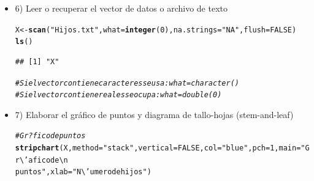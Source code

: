 \documentclass[12pt,letterpaper]{article}\usepackage[]{graphicx}\usepackage[]{color}
\makeatletter
\newcommand{\hlnum}[1]{\textcolor[rgb]{0.686,0.059,0.569}{#1}}%
\newcommand{\hlstr}[1]{\textcolor[rgb]{0.192,0.494,0.8}{#1}}%
\newcommand{\hlcom}[1]{\textcolor[rgb]{0.678,0.584,0.686}{\textit{#1}}}%
\newcommand{\hlstd}[1]{\textcolor[rgb]{0.345,0.345,0.345}{#1}}%
\newcommand{\hlkwb}[1]{\textcolor[rgb]{0.69,0.353,0.396}{#1}}%
\newcommand{\hlkwc}[1]{\textcolor[rgb]{0.333,0.667,0.333}{#1}}%
\newcommand{\hlkwd}[1]{\textcolor[rgb]{0.737,0.353,0.396}{\textbf{#1}}}%
\newenvironment{kframe}{%
 \def\at@end@of@kframe{}%
 \ifinner\ifhmode%
  \def\at@end@of@kframe{\end{minipage}}%
  \begin{minipage}{\columnwidth}%
 \fi\fi%
 \def\FrameCommand##1{\hskip\@totalleftmargin \hskip-\fboxsep
 \colorbox{shadecolor}{##1}\hskip-\fboxsep
     \hskip-\linewidth \hskip-\@totalleftmargin \hskip\columnwidth}%
 \MakeFramed {\advance\hsize-\width
   \@totalleftmargin\z@ \linewidth\hsize
   \@setminipage}}%
 {\par\unskip\endMakeFramed%
 \at@end@of@kframe}
\newenvironment{knitrout}{}{} %
\makeatother
\begin{document}
\begin {itemize}
\begin{knitrout}
\begin{kframe}
\begin{alltt}
\hlkwd{rm}\hlstd{(}\hlkwc{list}\hlstd{=}\hlkwd{ls}\hlstd{(}\hlkwc{all}\hlstd{=}\hlnum{TRUE}\hlstd{));}
\hlkwd{ls}\hlstd{()}
\end{alltt}
\begin{verbatim}
## character(0)
\end{verbatim}
\end{kframe}
\end{knitrout}
\newpage
\item 6) Leer o recuperar el vector de datos o archivo de texto
\begin{knitrout}
\color{fgcolor}\begin{kframe}
\begin{alltt}
\hlstd{X} \hlkwb{<-} \hlkwd{scan}\hlstd{(}\hlstr{"Hijos.txt"}\hlstd{,} \hlkwc{what} \hlstd{=} \hlkwd{integer}\hlstd{(}\hlnum{0}\hlstd{),} \hlkwc{na.strings} \hlstd{=} \hlstr{"NA"}\hlstd{,} \hlkwc{flush}\hlstd{=}\hlnum{FALSE}\hlstd{)}
\hlkwd{ls}\hlstd{()}
\end{alltt}
\begin{verbatim}
## [1] "X"
\end{verbatim}
\begin{alltt}
\hlcom{# Si el vector contiene caracteres se usa: what = character()}
\hlcom{# Si el vector contiene reales se ocupa: what = double(0)}
\end{alltt}
\end{kframe}
\end{knitrout}
\item 7) Elaborar el gr\'afico de puntos y diagrama de tallo-hojas (stem-and-leaf)
\begin{knitrout}
\color{fgcolor}\begin{kframe}
\begin{alltt}
\hlcom{# Gr?fico de puntos}
\hlkwd{stripchart}\hlstd{(X,} \hlkwc{method}\hlstd{=}\hlstr{"stack"}\hlstd{,} \hlkwc{vertical}\hlstd{=}\hlnum{FALSE}\hlstd{,} \hlkwc{col}\hlstd{=}\hlstr{"blue"}\hlstd{,} \hlkwc{pch}\hlstd{=}\hlnum{1}\hlstd{,} \hlkwc{main}\hlstd{=}\hlstr{"Gr\textbackslash{}'afico de\textbackslash{}n
puntos"}\hlstd{,} \hlkwc{xlab}\hlstd{=}\hlstr{"N\textbackslash{}'umero de hijos"}\hlstd{)}
\end{alltt}
\end{kframe}

\end{knitrout}
\end{itemize}
\end{document}
